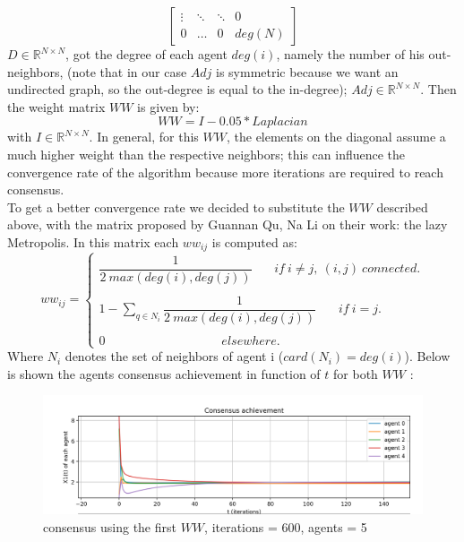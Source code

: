 \documentclass[a4paper,11pt,oneside]{book}
\begin{document}
{{\[\begin{bmatrix}
    \vdots & \ddots & \ddots & 0\\
    0 &  \dots & 0 &  deg(N)
    \end{bmatrix}
\]
$D \in \mathbb{R}^{{N}\times{N}}$, got the degree of each agent $deg(i)$, namely the number of his out-neighbors, (note that in our case $Adj$ is symmetric because we want an undirected graph, so the out-degree is equal to the in-degree); $Adj \in \mathbb{R}^{{N}\times{N}}$. Then the weight matrix $WW$ is given by: 
\begin{equation}
 WW= I - 0.05*Laplacian
\end{equation}
with $I\in \mathbb{R}^{{N}\times{N}}$. In general, for this $WW$, the elements on the diagonal assume a much higher weight than the respective neighbors; this can influence the convergence rate of the algorithm because more iterations are required to reach consensus.
\\ To get a better convergence rate we decided to substitute the $WW$ described above, with the matrix proposed by Guannan Qu, Na Li on their work: the lazy Metropolis. In this matrix each $ww_{ij}$ is computed as:
\begin{equation}
 ww_{ij} =
   \begin{cases}
   \dfrac{1}{2~max(deg(i) , deg(j))}~~~~~~~~if~ i\neq j,~ (i, j)~ connected.\\\\ 1 -\sum\limits_{q \in N_{i}}\dfrac{1}{2~max(deg(i), deg(j))}~~~~~~~~if~ i = j.\\\\0~~~~~~~~~~~~~~~~~~~~~~~~~~~~~~~~~~~~~~~~~~ elsewhere.
   \end{cases}
\end{equation}
Where $N_{i}$ denotes the set of neighbors of agent i ($card(N_{i})=deg(i)$).
Below is shown the agents consensus achievement in function of $t$ for both $WW$  :

\begin{figure}[H]
 \centering
 \includegraphics[width=14.5 cm]{ww.jpg}
 \caption{consensus using the first $WW$, iterations = 600, agents = 5}
 

\end{figure}}}
\end{document}
